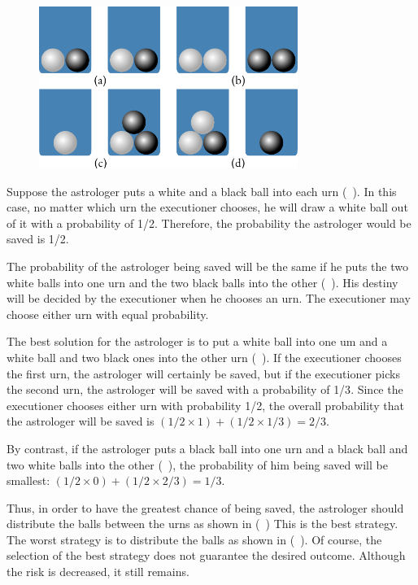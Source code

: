 \begin{figure}[!ht]
 \centering
 \includegraphics[width=0.75\textwidth]{figures/ball-picking.pdf}
 \end{figure}

Suppose the astrologer puts a white and a black ball into each urn
(~). In this case, no matter which urn the executioner chooses, he will draw a white ball out of it with a probability of 1/2. Therefore, the probability the astrologer would be saved is 1/2.

The probability of the astrologer being saved will be the same if he
puts the two white balls into one urn and the two black balls into the
other (~). His destiny will be decided by the executioner when he chooses an urn. The executioner may choose either urn with equal probability.

The best solution for the astrologer is to put a white ball into one um
and a white ball and two black ones into the other urn (~). If the executioner chooses the ﬁrst urn, the astrologer will certainly be saved, but if the executioner picks the second urn, the astrologer will be saved with a probability of {1/3}. Since the executioner chooses either urn with probability {1/2}, the overall probability that the astrologer will be saved is $(1/2 \times 1)+(1/2 \times 1/3)=2/3$.

By contrast, if the astrologer puts a black ball into one urn and
a black ball and two white balls into the other (~), the probability of him being saved will be smallest: $(1/2 \times 0)+(1/2 \times 2/3) = 1/3$.

Thus, in order to have the greatest chance of being saved, the
astrologer should distribute the balls between the urns as shown in
(~) This is the best strategy. The worst
strategy is to distribute the balls as shown in (~). Of course, the selection of the best strategy does not guarantee the desired outcome. Although the risk is decreased, it still remains.

